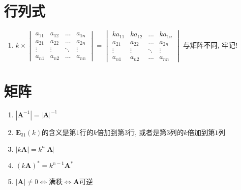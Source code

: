 \chapter{行列式}
\begin{enumerate}
\item $k \times
\begin{vmatrix}
a_{11} & a_{12} & \dots & a_{1n} \\
a_{21} & a_{22} & \dots & a_{2n} \\
\vdots & \vdots & \ddots & \vdots \\
a_{n1} & a_{n2} & \dots & a_{nn}
\end{vmatrix} =
\begin{vmatrix}
ka_{11} & ka_{12} & \dots & ka_{1n} \\
a_{21} & a_{22} & \dots & a_{2n} \\
\vdots & \vdots & \ddots & \vdots \\
a_{n1} & a_{n2} & \dots & a_{nn}
\end{vmatrix} $
与矩阵不同, 牢记!
\end{enumerate}
\chapter{矩阵}
\begin{enumerate}
\item $|\bm{A}^{-1}|=|\bm{A}|^{-1}$
\item $\bm{E}_{31}(k)$的含义是第$1$行的$k$倍加到第$3$行, 或者是第$3$列的$k$倍加到第$1$列
\item $|k \bm{A}|=k^{n}|\bm{A}|$
\item $(k \bm{A})^{*}=k^{n-1} \bm{A}^{*}$
\item $|\bm{A}|\neq 0\Leftrightarrow$满秩$\Leftrightarrow \bm{A}$可逆
\end{enumerate}
